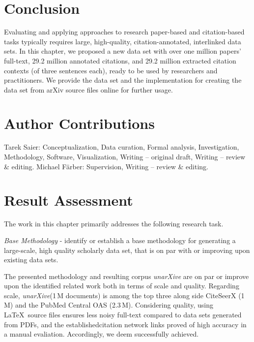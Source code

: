 \section{Conclusion}
\label{sec:conclusion}

Evaluating and applying approaches to research paper-based and citation-based tasks typically requires large, high-quality, citation-annotated, interlinked data sets. In this chapter, we proposed a new data set with over one million papers' full-text, 29.2 million annotated citations, and 29.2 million extracted citation contexts (of three sentences each), ready to be used by researchers and practitioners.
We provide the data set and the implementation for creating the data set from arXiv source files online for further usage.


\section{Author Contributions}  %
Tarek Saier: Conceptualization, Data curation, Formal analysis, Investigation, Methodology, Software, Visualization, Writing -- original draft, Writing -- review \& editing. Michael F{\"a}rber: Supervision, Writing -- review \& editing.

\section{Result Assessment}
\label{sec:corpus-assessment}

The work in this chapter primarily addresses the following research task.

\begin{rtlist}
    \item \textit{Base Methodology} - identify or establish a base methodology for generating a large-scale, high quality scholarly data set, that is on par with or improving upon existing data sets.
\end{rtlist}

The presented methodology and resulting corpus \emph{unarXive} are on par or improve upon the identified related work both in terms of scale and quality. Regarding scale, \emph{unarXive}(1\,M documents) is among the top three along side CiteSeerX (1\,M) and the PubMed Central OAS (2.3\,M). Considering quality, using \LaTeX\ source files ensures less noisy full-text compared to data sets generated from PDFs, and the establishedcitation network links proved of high accuracy in a manual evaliation. Accordingly, we deem  successfully achieved.

